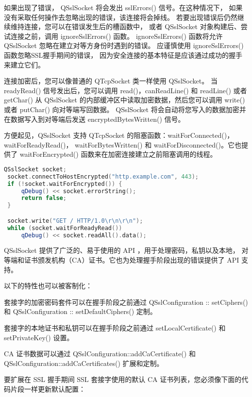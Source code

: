 如果出现了错误， QSslSocket 将会发出 sslErrors() 信号。在这种情况下，
如果没有采取任何操作去忽略出现的错误，该连接将会掉线。
若要出现错误后仍然继续维持连接，您可以在错误发生后的槽函数中，
或者 QSslSocket 对象构建后、尝试连接之前，调用 ignoreSslErrors() 函数。
ignoreSslErrors() 函数将允许 QSslSocket 忽略在建立对等方身份时遇到的错误。
 应谨慎使用 ignoreSslErrors() 函数忽略SSL握手期间的错误，
 因为安全连接的基本特征是应该通过成功的握手来建立它们。

连接加密后，您可以像普通的 QTcpSocket 类一样使用 QSslSocket。
当 readyRead() 信号发出后，您可以调用 read()，canReadLine() 和 readLine() 或者 
getChar() 从 QSslSocket 的内部缓冲区中读取加密数据，然后您可以调用 write() 或者 putChar() 向对等端写回数据。
 QSslSocket 将会自动将您写入的数据加密并在数据写入到对等端后发送 encryptedBytesWritten() 信号。

方便起见，QSslSocket 支持 QTcpSocket 的阻塞函数：waitForConnected()，waitForReadyRead()，
waitForBytesWritten() 和 waitForDisconnected()。它也提供了 waitForEncrypted()
 函数来在加密连接建立之前阻塞调用的线程。


\begin{lstlisting}[language=C++]
 QSslSocket socket;
 socket.connectToHostEncrypted("http.example.com", 443);
 if (!socket.waitForEncrypted()) {
     qDebug() << socket.errorString();
     return false;
 }

 socket.write("GET / HTTP/1.0\r\n\r\n");
 while (socket.waitForReadyRead())
     qDebug() << socket.readAll().data();
\end{lstlisting}

QSslSocket 提供了广泛的、易于使用的 API ，用于处理密码，私钥以及本地，
对等端和证书颁发机构（CA）证书。它也为处理握手阶段出现的错误提供了 API 支持。

以下的特性也可以被客制化：

\begin{compactitem}[\arr]
\item 套接字的加密密码套件可以在握手阶段之前通过 QSslConfiguration :: setCiphers() 和 QSslConfiguration :: setDefaultCiphers() 定制。
\item 套接字的本地证书和私钥可以在握手阶段之前通过 setLocalCertificate() 和 setPrivateKey() 设置。
\item CA 证书数据可以通过 QSslConfiguration::addCaCertificate() 和 QSslConfiguration::addCaCertificates() 扩展和定制。
\end{compactitem}

要扩展在 SSL 握手期间 SSL 套接字使用的默认 CA 证书列表，您必须像下面的代码片段一样更新默认配置：

